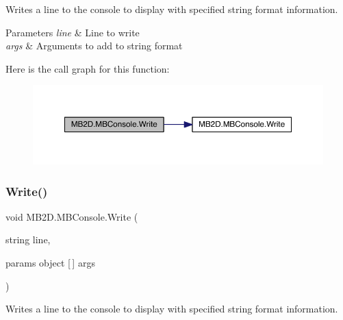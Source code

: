 Writes a line to the console to display with specified string format information. 


\begin{DoxyParams}{Parameters}
{\em line} & Line to write\\
\hline
{\em args} & Arguments to add to string format\\
\hline
\end{DoxyParams}
Here is the call graph for this function\+:
\nopagebreak
\begin{figure}[H]
\begin{center}
\leavevmode
\includegraphics[width=350pt]{class_m_b2_d_1_1_m_b_console_a77bc48284eeebbc13eeced6451513c09_cgraph}
\end{center}
\end{figure}
\hypertarget{class_m_b2_d_1_1_m_b_console_ad7f7617e28472374b97fee653bd786be}{}\label{class_m_b2_d_1_1_m_b_console_ad7f7617e28472374b97fee653bd786be} 
\subsubsection{\texorpdfstring{Write()}{Write()}\hspace{0.1cm}{\footnotesize\ttfamily [3/3]}}
{\footnotesize\ttfamily void M\+B2\+D.\+M\+B\+Console.\+Write (\begin{DoxyParamCaption}\item[{string}]{line,  }\item[{params object \mbox{[}$\,$\mbox{]}}]{args }\end{DoxyParamCaption})\hspace{0.3cm}{\ttfamily [inline]}}



Writes a line to the console to display with specified string format information. 


